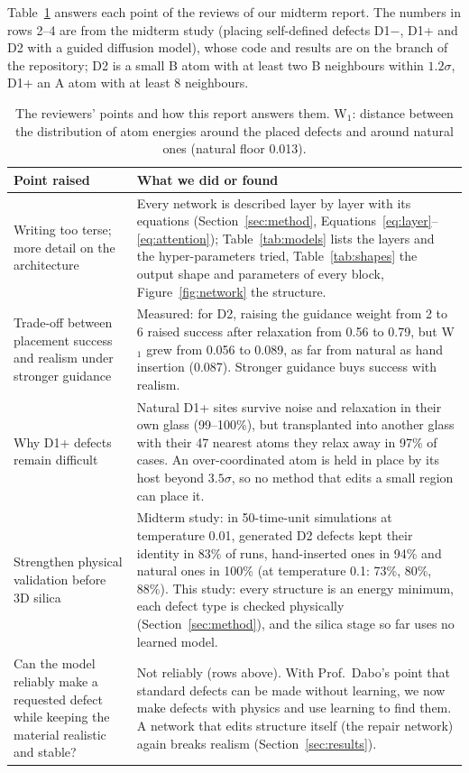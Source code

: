 \documentclass[10pt]{article}
\begin{document}
Table~\ref{tab:midterm} answers each point of the reviews of our midterm report. The numbers in rows 2--4 are from the midterm study (placing self-defined defects D1$-$, D1+ and D2 with a guided diffusion model), whose code and results are on the branch  of the repository; D2 is a small B atom with at least two B neighbours within $1.2\sigma$, D1+ an A atom with at least 8 neighbours.

\begin{table}[h]
\centering
\caption{The reviewers' points and how this report answers them. W$_1$: distance between the distribution of atom energies around the placed defects and around natural ones (natural floor 0.013).}
\label{tab:midterm}
\footnotesize\setlength{\tabcolsep}{4pt}
\begin{tabularx}{\linewidth}{@{}>{\raggedright\arraybackslash}p{1.45in}>{\raggedright\arraybackslash}X@{}}
\toprule
Point raised & What we did or found \\
\midrule
Writing too terse; more detail on the architecture & Every network is described layer by layer with its equations (Section~\ref{sec:method}, Equations~\ref{eq:layer}--\ref{eq:attention}); Table~\ref{tab:models} lists the layers and the hyper-parameters tried, Table~\ref{tab:shapes} the output shape and parameters of every block, Figure~\ref{fig:network} the structure. \\
\addlinespace
Trade-off between placement success and realism under stronger guidance & Measured: for D2, raising the guidance weight from 2 to 6 raised success after relaxation from 0.56 to 0.79, but W$_1$ grew from 0.056 to 0.089, as far from natural as hand insertion (0.087). Stronger guidance buys success with realism. \\
\addlinespace
Why D1+ defects remain difficult & Natural D1+ sites survive noise and relaxation in their own glass (99--100\%), but transplanted into another glass with their 47 nearest atoms they relax away in 97\% of cases. An over-coordinated atom is held in place by its host beyond $3.5\sigma$, so no method that edits a small region can place it. \\
\addlinespace
Strengthen physical validation before 3D silica & Midterm study: in 50-time-unit simulations at temperature 0.01, generated D2 defects kept their identity in 83\% of runs, hand-inserted ones in 94\% and natural ones in 100\% (at temperature 0.1: 73\%, 80\%, 88\%). This study: every structure is an energy minimum, each defect type is checked physically (Section~\ref{sec:method}), and the silica stage so far uses no learned model. \\
\addlinespace
Can the model reliably make a requested defect while keeping the material realistic and stable? & Not reliably (rows above). With Prof.\ Dabo's point that standard defects can be made without learning, we now make defects with physics and use learning to find them. A network that edits structure itself (the repair network) again breaks realism (Section~\ref{sec:results}). \\
\bottomrule
\end{tabularx}
\end{table}
\end{document}
